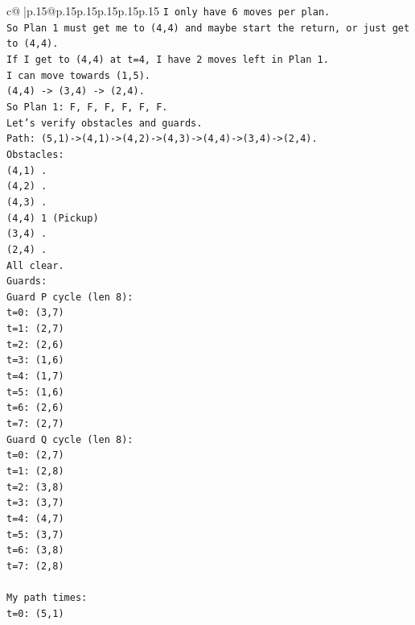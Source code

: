 \documentclass{article}
\begin{document}
{\begin{supertabular}{c@{$\;$}|p{.15\linewidth}@{}p{.15\linewidth}p{.15\linewidth}p{.15\linewidth}p{.15\linewidth}p{.15\linewidth}}
{{{\texttt{I only have 6 moves per plan.} \\
\texttt{So Plan 1 must get me to (4,4) and maybe start the return, or just get to (4,4).} \\
\texttt{If I get to (4,4) at t=4, I have 2 moves left in Plan 1.} \\
\texttt{I can move towards (1,5).} \\
\texttt{(4,4) {-}> (3,4) {-}> (2,4).} \\
\texttt{So Plan 1: F, F, F, F, F, F.} \\
\texttt{Let's verify obstacles and guards.} \\
\texttt{Path: (5,1){-}>(4,1){-}>(4,2){-}>(4,3){-}>(4,4){-}>(3,4){-}>(2,4).} \\
\texttt{Obstacles:} \\
\texttt{(4,1) .} \\
\texttt{(4,2) .} \\
\texttt{(4,3) .} \\
\texttt{(4,4) 1 (Pickup)} \\
\texttt{(3,4) .} \\
\texttt{(2,4) .} \\
\texttt{All clear.} \\
\texttt{Guards:} \\
\texttt{Guard P cycle (len 8):} \\
\texttt{t=0: (3,7)} \\
\texttt{t=1: (2,7)} \\
\texttt{t=2: (2,6)} \\
\texttt{t=3: (1,6)} \\
\texttt{t=4: (1,7)} \\
\texttt{t=5: (1,6)} \\
\texttt{t=6: (2,6)} \\
\texttt{t=7: (2,7)} \\
\texttt{Guard Q cycle (len 8):} \\
\texttt{t=0: (2,7)} \\
\texttt{t=1: (2,8)} \\
\texttt{t=2: (3,8)} \\
\texttt{t=3: (3,7)} \\
\texttt{t=4: (4,7)} \\
\texttt{t=5: (3,7)} \\
\texttt{t=6: (3,8)} \\
\texttt{t=7: (2,8)} \\
\\ 
\texttt{My path times:} \\
\texttt{t=0: (5,1)} \\
}}}
\end{supertabular}}
\end{document}
